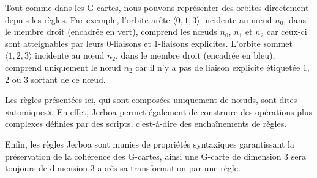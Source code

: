 Tout comme dans les G-cartes, nous pouvons représenter des orbites directement
depuis les règles. %
Par exemple, l'orbite arête $\langle 0, 1, 3 \rangle$ incidente au nœud $n_{0}$,
dans le membre droit (encadrée en vert), comprend les nœuds $n_{0}$, $n_{1}$ et
$n_{2}$ car ceux-ci sont atteignables par leurs $0$-liaisons et $1$-liaisons
explicites. %
L'orbite sommet $\langle 1, 2, 3 \rangle$ incidente au nœud $n_{2}$, dans le
membre droit (encadrée en bleu), comprend uniquement le nœud $n_{2}$ car il n'y
a pas de liaison explicite étiquetée $1$, $2$ ou $3$ sortant de ce nœud. %

Les règles présentées ici, qui sont composées uniquement de nœuds, sont dites
«atomiques».%
En effet, Jerboa permet également de construire des opérations plus complexes
définies par des scripts, c'est-à-dire des enchaînements de règles. %

Enfin, les règles Jerboa sont munies de propriétés syntaxiques garantissant la
préservation de la cohérence des G-cartes, ainsi une G-carte de dimension 3 sera
toujours de dimension 3 après sa transformation par une règle. %





